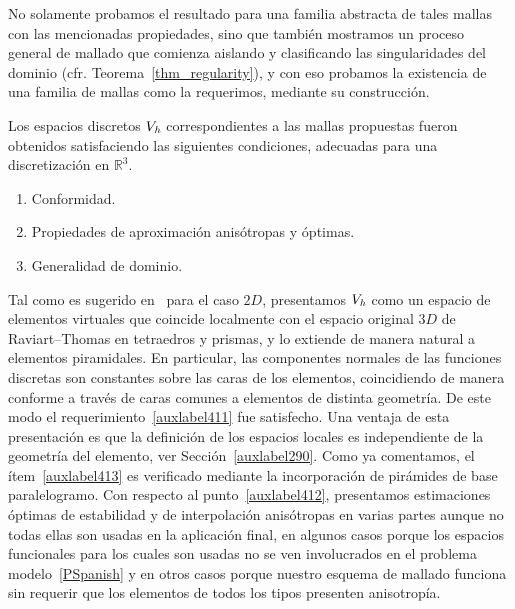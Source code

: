 No solamente probamos el resultado para una familia abstracta
de tales mallas con las mencionadas propiedades,
 sino que tambi\'en mostramos un proceso general de mallado
 que comienza aislando y clasificando las singularidades
del dominio (cfr. Teorema~\ref{thm_regularity}), y
con eso probamos la existencia de una familia de mallas
como la requerimos, mediante su construcci\'on.

Los espacios discretos $V_{\textit h}$ correspondientes
a las mallas propuestas fueron obtenidos satisfaciendo
las siguientes condiciones, adecuadas para una discretizaci\'on
en $\mathbb{R}^3$.
\begin{enumerate}
	\item \label{auxlabel411} Conformidad.
	\item \label{auxlabel412} Propiedades de aproximaci\'on anis\'otropas y \'optimas.
	\item \label{auxlabel413} Generalidad de dominio.
\end{enumerate}
Tal como es sugerido en~\cite{bfm} para el caso $2D$,
presentamos $V_{\textit h}$ como un espacio de elementos 
virtuales que coincide localmente con el espacio original
$3D$ de Raviart--Thomas en tetraedros y prismas, y lo
extiende de manera natural a elementos piramidales. 
En particular, las componentes normales de las
funciones discretas son constantes sobre las caras de
los elementos, coincidiendo de manera conforme a trav\'es 
de caras comunes a elementos de distinta geometr\'ia. De
este modo el requerimiento~\ref{auxlabel411} fue satisfecho.
Una ventaja de esta presentaci\'on es que la definici\'on
de los espacios locales es independiente de la geometr\'ia 
del elemento, ver Secci\'on~\ref{auxlabel290}. Como ya comentamos,
el \'item~\ref{auxlabel413} es verificado mediante la 
incorporaci\'on de pir\'amides de base paralelogramo.
Con respecto al punto~\ref{auxlabel412}, presentamos
estimaciones \'optimas de estabilidad y de interpolaci\'on
anis\'otropas en varias partes aunque no todas ellas
son usadas en la aplicaci\'on final, en algunos casos
porque los espacios funcionales para los cuales son usadas
no se ven involucrados en el problema 
modelo~\eqref{PSpanish} y en otros casos porque
nuestro esquema de mallado funciona sin requerir
que los elementos de todos los tipos presenten 
anisotrop\'ia.

